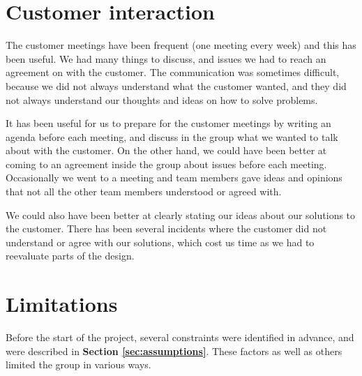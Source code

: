 \section{Customer interaction}

The customer meetings have been frequent (one meeting every week) and this has been useful. We had many things to discuss, and issues we had to reach an agreement on with the customer. The communication was sometimes difficult, because we did not always understand what the customer wanted, and they did not always understand our thoughts and ideas on how to solve problems.\newline

It has been useful for us to prepare for the customer meetings by writing an agenda before each meeting, and discuss in the group what we wanted to talk about with the customer. On the other hand, we could have been better at coming to an agreement inside the group about issues before each meeting. Occasionally we went to a meeting and team members gave ideas and opinions that not all the other team members understood or agreed with.\newline

We could also have been better at clearly stating our ideas about our solutions to the customer.  There has been several incidents where the customer did not understand or agree with our solutions, which cost us time as we had to reevaluate parts of the design.

\section{Limitations}

Before the start of the project, several constraints were identified in advance, and were described in \textbf{Section \ref{sec:assumptions}}. These factors as well as others limited the group in various ways.

